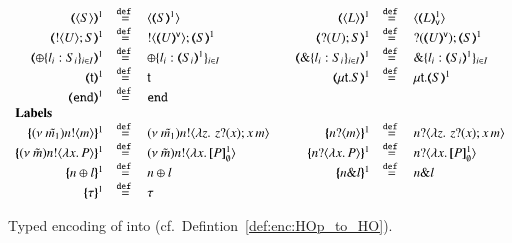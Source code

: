 \begin{figure}[h!]
\[\begin{array}{rclcrcl}
		\tmap{\chtype{S}}{1}		&\defeq& \chtype{\tmap{S}{1}}
		& &
		\tmap{\chtype{L}}{1}		&\defeq& \chtype{\tmap{L}{1}_\mathsf{v}}
		\\
		\tmap{\btout{U} S}{1}		&\defeq& \btout{\tmap{U}{\mathsf{v}}} \tmap{S}{1}
		& &
		\tmap{\btinp{U} S}{1}		&\defeq& \btinp{\tmap{U}{\mathsf{v}}} \tmap{S}{1}
		\\
		\tmap{\btsel{l_i: S_i}_{i \in I}}{1} &\defeq& \btsel{l_i: \tmap{S_i}{1}}_{i \in I}
		& &
		\tmap{\btbra{l_i: S_i}_{i \in I}}{1} &\defeq& \btbra{l_i: \tmap{S_i}{1}}_{i \in I}
		\\
		\tmap{\vart{t}}{1} &\defeq& \vart{t}
		& &
		\tmap{\trec{t}{S}}{1} &\defeq& \trec{t}{\tmap{S}{1}}
		\\
		\tmap{\tinact}{1} &\defeq& \tinact
		\\
		\multicolumn{7}{l}{\textrm{\bf Labels}}
		\\
		\mapa{\news{\tilde{m_1}}\bactout{n}{m}}^{1}	&\defeq&	\news{\tilde{m_1}}\bactout{n}{\abs{z}{\,\binp{z}{x} \appl{x}{m}} }
		& &
		\mapa{\bactinp{n}{m}}^{1}			&\defeq&	\bactinp{n}{\abs{z}{\,\binp{z}{x} \appl{x}{m}} }
		\\
		\mapa{\news{\tilde{m}}\bactout{n}{\abs{x}{P}}}^{1} &\defeq& \news{\tilde{m}}\bactout{n}{\abs{x}{\pmapp{P}{1}{\es}}}
		& &
		\mapa{\bactinp{n}{\abs{x}{P}}}^{1} &\defeq& \bactinp{n}{\abs{x}{\pmapp{P}{1}{\es}}}
		\\
		\mapa{\bactsel{n}{l} }^{1} &\defeq& \bactsel{n}{l} 
		& &
		\mapa{\bactbra{n}{l} }^{1} &\defeq& \bactbra{n}{l} 
		\\
		\mapa{\tau}^{1} &\defeq& \tau

	\end{array}
\]
	\caption{
		\label{fig:enc:HOp_to_HO}
		Typed encoding of \HOp into \HO (cf.~Defintion~\ref{def:enc:HOp_to_HO}).
	}
\end{figure}

